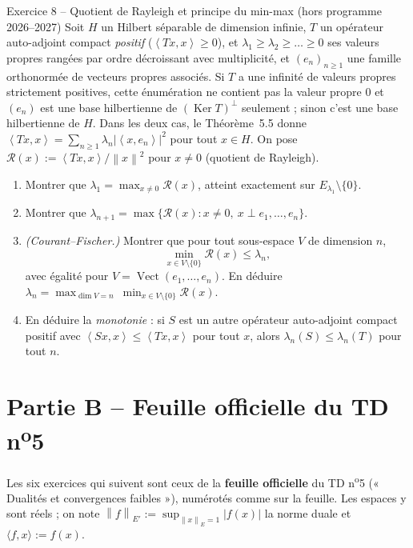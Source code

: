 \documentclass[11pt,a4paper]{article}
\newcommand{\Vect}{\operatorname{Vect}}
\newcommand{\norm}[1]{\left\|#1\right\|}
\newcommand{\ps}[2]{\left\langle #1,#2\right\rangle}
\DeclareMathOperator{\Ker}{Ker}
\theoremstyle{definition}
\begin{document}
\begin{exo}{Exercice 8 -- Quotient de Rayleigh et principe du min-max (hors programme 2026--2027)}
Soit $H$ un Hilbert séparable de dimension infinie, $T$ un opérateur auto-adjoint compact \emph{positif} ($\ps{Tx}x\ge0$), et $\lambda_1\ge\lambda_2\ge\dots\ge0$ ses valeurs propres rangées par ordre décroissant avec multiplicité, et $(e_n)_{n\ge1}$ une famille orthonormée de vecteurs propres associés. Si $T$ a une infinité de valeurs propres strictement positives, cette énumération ne contient pas la valeur propre $0$ et $(e_n)$ est une base hilbertienne de $(\Ker T)^\perp$ seulement ; sinon c'est une base hilbertienne de $H$. Dans les deux cas, le Théorème~5.5 donne $\ps{Tx}x=\sum_{n\ge1}\lambda_n|\ps x{e_n}|^2$ pour tout $x\in H$. On pose $\mathcal R(x):=\ps{Tx}x/\norm x^2$ pour $x\ne0$ (quotient de Rayleigh).
\begin{enumerate}[label=(\alph*)]
  \item Montrer que $\lambda_1=\max_{x\ne0}\mathcal R(x)$, atteint exactement sur $E_{\lambda_1}\setminus\{0\}$.
  \item Montrer que $\lambda_{n+1}=\max\{\mathcal R(x):x\ne0,\ x\perp e_1,\dots,e_n\}$.
  \item \emph{(Courant--Fischer.)} Montrer que pour tout sous-espace $V$ de dimension $n$,
  \[
  \min_{x\in V\setminus\{0\}}\mathcal R(x)\le\lambda_n,
  \]
  avec égalité pour $V=\Vect(e_1,\dots,e_n)$. En déduire $\lambda_n=\max_{\dim V=n}\ \min_{x\in V\setminus\{0\}}\mathcal R(x)$.
  \item En déduire la \emph{monotonie} : si $S$ est un autre opérateur auto-adjoint compact positif avec $\ps{Sx}x\le\ps{Tx}x$ pour tout $x$, alors $\lambda_n(S)\le\lambda_n(T)$ pour tout $n$.
\end{enumerate}
\end{exo}

\section*{Partie B -- Feuille officielle du TD n\textsuperscript{o}5}

\begin{commentaire}
Les six exercices qui suivent sont ceux de la \textbf{feuille officielle} du TD n\textsuperscript{o}5 (« Dualités et convergences faibles »), numérotés comme sur la feuille. Les espaces y sont réels ; on note $\norm f_{E'}:=\sup_{\norm x_E=1}|f(x)|$ la norme duale et $\langle f,x\rangle:=f(x)$.
\end{commentaire}
\end{document}

